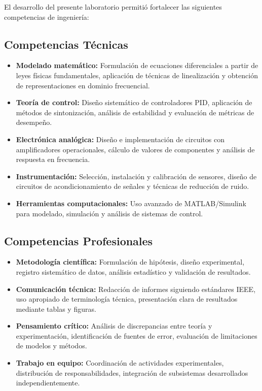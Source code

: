 \documentclass[conference]{IEEEtran}
\begin{document}
El desarrollo del presente laboratorio permitió fortalecer las siguientes competencias de ingeniería:

\subsection{Competencias Técnicas}

\begin{itemize}
\item \textbf{Modelado matemático:} Formulación de ecuaciones diferenciales a partir de leyes físicas fundamentales, aplicación de técnicas de linealización y obtención de representaciones en dominio frecuencial.

\item \textbf{Teoría de control:} Diseño sistemático de controladores PID, aplicación de métodos de sintonización, análisis de estabilidad y evaluación de métricas de desempeño.

\item \textbf{Electrónica analógica:} Diseño e implementación de circuitos con amplificadores operacionales, cálculo de valores de componentes y análisis de respuesta en frecuencia.

\item \textbf{Instrumentación:} Selección, instalación y calibración de sensores, diseño de circuitos de acondicionamiento de señales y técnicas de reducción de ruido.

\item \textbf{Herramientas computacionales:} Uso avanzado de MATLAB/Simulink para modelado, simulación y análisis de sistemas de control.
\end{itemize}

\subsection{Competencias Profesionales}

\begin{itemize}
\item \textbf{Metodología científica:} Formulación de hipótesis, diseño experimental, registro sistemático de datos, análisis estadístico y validación de resultados.

\item \textbf{Comunicación técnica:} Redacción de informes siguiendo estándares IEEE, uso apropiado de terminología técnica, presentación clara de resultados mediante tablas y figuras.

\item \textbf{Pensamiento crítico:} Análisis de discrepancias entre teoría y experimentación, identificación de fuentes de error, evaluación de limitaciones de modelos y métodos.

\item \textbf{Trabajo en equipo:} Coordinación de actividades experimentales, distribución de responsabilidades, integración de subsistemas desarrollados independientemente.
\end{itemize}
\end{document}
